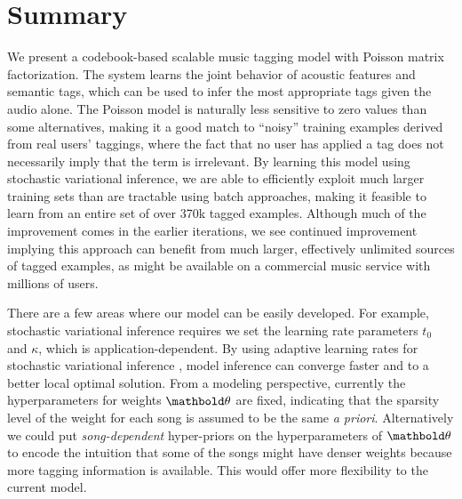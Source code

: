 \section{Summary}\label{sec:conclusion}
We present a codebook-based scalable music tagging model with Poisson matrix factorization. 
The system learns the joint behavior of acoustic features and semantic tags, which can be used to infer 
the most appropriate tags given the audio alone.  The Poisson model is naturally less sensitive to 
zero values than some alternatives, making it a good match to ``noisy'' training examples derived from 
real users' taggings, where the fact that no user has applied a tag does not necessarily imply that the term is irrelevant.  By learning this model using stochastic variational inference, we are able to efficiently 
exploit much larger training sets than are tractable using batch approaches, making it feasible to learn 
from an entire set of over 370k tagged examples.  Although much of the improvement comes in the earlier iterations, we see continued improvement implying this approach can benefit from much larger, effectively unlimited sources of tagged examples, as might be available on a commercial music service with millions of users.

There are a few areas where our model can be easily developed. For example, stochastic variational inference requires we set the learning rate parameters $t_0$ and $\kappa$, which is application-dependent. By using adaptive learning rates for stochastic variational inference \citep{ranganath2013adaptive}, model inference can converge faster and to a better local optimal solution. From a modeling perspective, currently the hyperparameters for weights $\mb{\theta}$ are fixed, indicating that the sparsity level of the weight for each song is assumed to be the same \emph{a priori}. Alternatively we could put \emph{song-dependent} hyper-priors on the hyperparameters of $\mb{\theta}$ to encode the intuition that some of the songs might have denser weights because more tagging information is available. This would offer more flexibility to the current model. 



%



